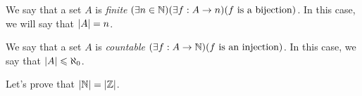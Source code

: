 \begin{definition}
    We say that a set $A$ is \emph{finite}
    \iffbydefn $\pn*{\exists n \in \N}\pn*{\exists f: A \to n}\pn*{f \text{ is a bijection}}$.
    In this case, we will say that $\lvert A\rvert = n$.
\end{definition}

\begin{definition}
    We say that a set $A$ is \emph{countable} \iffbydefn
    $\pn*{\exists f: A \to \N}\pn*{f \text{ is an injection}}$.
    In this case, we say that $\lvert A\rvert \leqslant \aleph_0$.
\end{definition}

\begin{example}
    Let's prove that $\lvert\mathbb{N}\rvert = \lvert\mathbb{Z}\rvert$.
\end{example}
